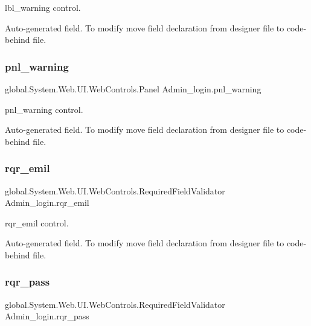 lbl\+\_\+warning control. 

Auto-\/generated field. To modify move field declaration from designer file to code-\/behind file. \mbox{\label{class_admin__login_a573527366803f07948992c342b209999}} 
\subsubsection{\texorpdfstring{pnl\_warning}{pnl\_warning}}
{\footnotesize\ttfamily global.\+System.\+Web.\+U\+I.\+Web\+Controls.\+Panel Admin\+\_\+login.\+pnl\+\_\+warning\hspace{0.3cm}{\ttfamily [protected]}}



pnl\+\_\+warning control. 

Auto-\/generated field. To modify move field declaration from designer file to code-\/behind file. \mbox{\label{class_admin__login_a43e637a72bf3673d9b2576e26a151f3a}} 
\subsubsection{\texorpdfstring{rqr\_emil}{rqr\_emil}}
{\footnotesize\ttfamily global.\+System.\+Web.\+U\+I.\+Web\+Controls.\+Required\+Field\+Validator Admin\+\_\+login.\+rqr\+\_\+emil\hspace{0.3cm}{\ttfamily [protected]}}



rqr\+\_\+emil control. 

Auto-\/generated field. To modify move field declaration from designer file to code-\/behind file. \mbox{\label{class_admin__login_ab783b862cb4a762bb7520ca6319e8972}} 
\subsubsection{\texorpdfstring{rqr\_pass}{rqr\_pass}}
{\footnotesize\ttfamily global.\+System.\+Web.\+U\+I.\+Web\+Controls.\+Required\+Field\+Validator Admin\+\_\+login.\+rqr\+\_\+pass\hspace{0.3cm}{\ttfamily [protected]}}



